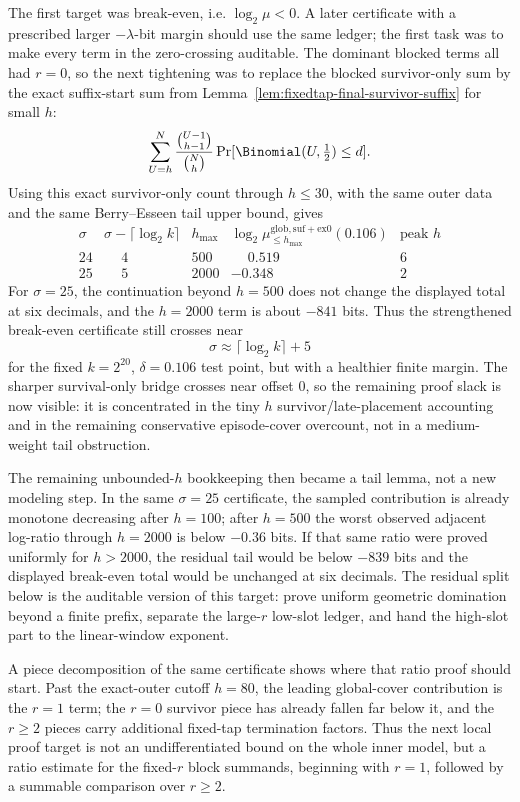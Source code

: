 The first target was break-even, i.e. \(\log_2\mu<0\).  A later certificate with a prescribed larger
\(-\lambda\)-bit margin should use the same ledger; the first task was to make every term in the zero-crossing
auditable.  The dominant blocked terms all had \(r=0\), so the next tightening was to replace the blocked
survivor-only sum by the exact suffix-start sum from Lemma~\ref{lem:fixedtap-final-survivor-suffix} for small \(h\):
\[
\sum_{U=h}^{N}
\frac{\binom{U-1}{h-1}}{\binom{N}{h}}
\Pr[\Binomial(U,\tfrac12)\le d].
\]
Using this exact survivor-only count through \(h\le30\), with the same outer data and the same Berry--Esseen tail
upper bound, gives
\[
\begin{array}{c|c|c|c|c}
\sigma & \sigma-\lceil\log_2 k\rceil & h_{\max} &
\log_2\mu_{\le h_{\max}}^{\mathrm{glob,suf+ex0}}(0.106) & \text{peak }h\\
\hline
24 & \phantom{-}4 & 500  & \phantom{-}0.519 & 6\\
25 & \phantom{-}5 & 2000 & -0.348 & 2
\end{array}
\]
For \(\sigma=25\), the continuation beyond \(h=500\) does not change the displayed total at six decimals, and the
\(h=2000\) term is about \(-841\) bits.  Thus the strengthened break-even certificate still crosses near
\[
\sigma\approx \lceil\log_2 k\rceil+5
\]
for the fixed \(k=2^{20}\), \(\delta=0.106\) test point, but with a healthier finite margin.  The sharper
survival-only bridge crosses near offset \(0\), so the remaining proof slack is now visible: it is concentrated in the
tiny \(h\) survivor/late-placement accounting and in the remaining conservative episode-cover overcount, not in a
medium-weight tail obstruction.

The remaining unbounded-\(h\) bookkeeping then became a tail lemma, not a new modeling step.  In the same
\(\sigma=25\) certificate, the sampled contribution is already monotone decreasing after \(h=100\); after \(h=500\)
the worst observed adjacent log-ratio through \(h=2000\) is below \(-0.36\) bits.  If that same ratio were proved
uniformly for \(h>2000\), the residual tail would be below \(-839\) bits and the displayed break-even total would be
unchanged at six decimals.  The residual split below is the auditable version of this target: prove uniform geometric
domination beyond a finite prefix, separate the large-\(r\) low-slot ledger, and hand the high-slot part to the
linear-window exponent.

A piece decomposition of the same certificate shows where that ratio proof should start.  Past the exact-outer cutoff
\(h=80\), the leading global-cover contribution is the \(r=1\) term; the \(r=0\) survivor piece has already fallen far
below it, and the \(r\ge2\) pieces carry additional fixed-tap termination factors.  Thus the next local proof target is
not an undifferentiated bound on the whole inner model, but a ratio estimate for the fixed-\(r\) block summands,
beginning with \(r=1\), followed by a summable comparison over \(r\ge2\).

